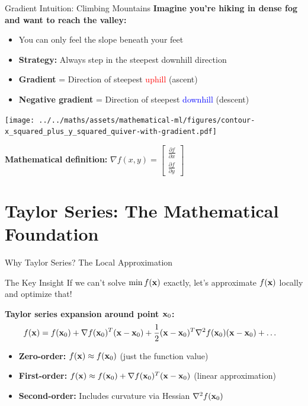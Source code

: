\documentclass[usenames,dvipsnames]{beamer}
\begin{document}
  \begin{frame}{Gradient Intuition: Climbing Mountains}
    \textbf{Imagine you're hiking in dense fog and want to reach the valley:}
    
    \begin{itemize}[<+->]
        \item You can only feel the slope beneath your feet
        \item \textbf{Strategy:} Always step in the steepest downhill direction
        \item \textbf{Gradient} = Direction of steepest \textcolor{red}{uphill} (ascent)
        \item \textbf{Negative gradient} = Direction of steepest \textcolor{blue}{downhill} (descent)
    \end{itemize}
    
    \pause
    \begin{center}
    \texttt{[image: ../../maths/assets/mathematical-ml/figures/contour-x\_squared\_plus\_y\_squared\_quiver-with-gradient.pdf]}
    \end{center}
    
    \pause
    \textbf{Mathematical definition:} $\nabla f(x, y) = \begin{bmatrix} \frac{\partial f}{\partial x} \\ \frac{\partial f}{\partial y} \end{bmatrix}$
  \end{frame}

  \section{Taylor Series: The Mathematical Foundation}

  \begin{frame}{Why Taylor Series? The Local Approximation}
    \begin{definitionbox}{The Key Insight}
    If we can't solve $\min f(\mathbf{x})$ exactly, let's approximate $f(\mathbf{x})$ locally and optimize that!
    \end{definitionbox}
    
    \pause
    \textbf{Taylor series expansion around point $\mathbf{x}_0$:}
    \begin{align}
        f(\mathbf{x}) &= f(\mathbf{x}_0) + \nabla f(\mathbf{x}_0)^T(\mathbf{x}-\mathbf{x}_0) + \frac{1}{2}(\mathbf{x}-\mathbf{x}_0)^T\nabla^2 f(\mathbf{x}_0)(\mathbf{x}-\mathbf{x}_0) + \ldots
    \end{align}
    
    \pause
    \begin{itemize}[<+->]
        \item \textbf{Zero-order:} $f(\mathbf{x}) \approx f(\mathbf{x}_0)$ (just the function value)
        \item \textbf{First-order:} $f(\mathbf{x}) \approx f(\mathbf{x}_0) + \nabla f(\mathbf{x}_0)^T(\mathbf{x}-\mathbf{x}_0)$ (linear approximation)
        \item \textbf{Second-order:} Includes curvature via Hessian $\nabla^2 f(\mathbf{x}_0)$
    \end{itemize}
  \end{frame}
\end{document}
